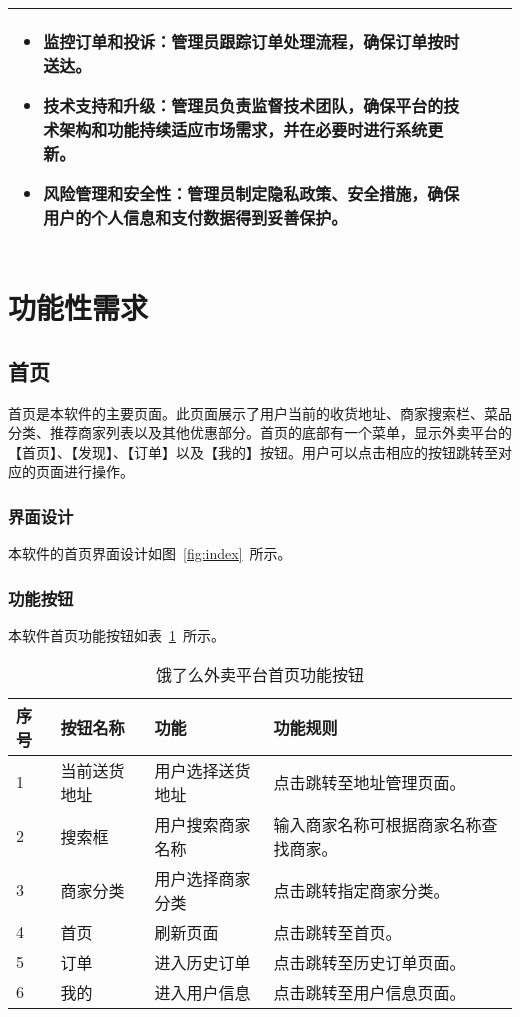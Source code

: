 \begin{table}[htbp]
\begin{tabularx}{\textwidth}{llX}
\begin{itemize}
    \item{\textbf{监控订单和投诉}}：管理员跟踪订单处理流程，确保订单按时送达。
    \item{\textbf{技术支持和升级}}：管理员负责监督技术团队，确保平台的技术架构和功能持续适应市场需求，并在必要时进行系统更新。
    \item {\textbf{风险管理和安全性}}：管理员制定隐私政策、安全措施，确保用户的个人信息和支付数据得到妥善保护。
\end{itemize}
\\
\bottomrule[1.5pt]
\end{tabularx}
\vspace{\baselineskip}
\end{table}

\section{功能性需求}
\subsection{首页}
首页是本软件的主要页面。此页面展示了用户当前的收货地址、商家搜索栏、菜品分类、推荐商家列表以及其他优惠部分。首页的底部有一个菜单，显示外卖平台的【首页】、【发现】、【订单】以及【我的】按钮。用户可以点击相应的按钮跳转至对应的页面进行操作。
\subsubsection{界面设计}
本软件的首页界面设计如图~\ref{fig:index}~所示。
\subsubsection{功能按钮}
本软件首页功能按钮如表~\ref{tab:table2}~所示。
\begin{table}[htbp]
    \caption{饿了么外卖平台首页功能按钮}\label{tab:table2}
    \vspace{0.5em}\wuhao
    \begin{tabularx}{\textwidth}{lllX}
    \toprule[1.5pt]
    序号 & 按钮名称 & 功能 & 功能规则 \\ 
    \midrule[1pt]
    1 & 当前送货地址 & 用户选择送货地址 & 点击跳转至地址管理页面。 \\
    2 & 搜索框 & 用户搜索商家名称 & 输入商家名称可根据商家名称查找商家。 \\
    3 & 商家分类 & 用户选择商家分类 & 点击跳转指定商家分类。 \\
    4 & 首页 & 刷新页面 & 点击跳转至首页。 \\
    5 & 订单 & 进入历史订单 & 点击跳转至历史订单页面。 \\
    6 & 我的 & 进入用户信息 & 点击跳转至用户信息页面。 \\
\bottomrule[1.5pt]
\end{tabularx}
\vspace{\baselineskip}
\end{table}

